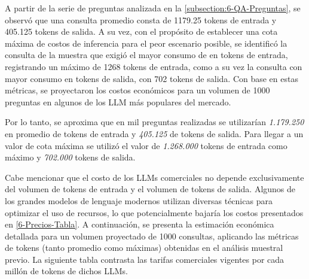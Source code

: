 A partir de la serie de preguntas analizada en la \autoref{subsection:6-QA-Preguntas}, se observó que una consulta promedio consta de 1179.25 tokens de entrada y 405.125 tokens de salida. A su vez, con el propósito de establecer una cota máxima de costos de inferencia para el peor escenario posible, se identificó la consulta de la muestra que exigió el mayor consumo de en tokens de entrada, registrando un máximo de 1268 tokens de entrada, como a su vez la consulta con mayor consumo en tokens de salida, con 702 tokens de salida. Con base en estas métricas, se proyectaron los costos económicos para un volumen de 1000 preguntas en algunos de los LLM más populares del mercado.

Por lo tanto, se aproxima que en mil preguntas realizadas se utilizarían \textit{1.179.250} en promedio de tokens de entrada y \textit{405.125} de tokens de salida. Para llegar a un valor de cota máxima se utilizó el valor de \textit{1.268.000} tokens de entrada como máximo y \textit{702.000} tokens de salida.  

Cabe mencionar que el costo de los LLMs comerciales no depende exclusivamente del volumen de tokens de entrada y el volumen de tokens de salida. Algunos de los grandes modelos de lenguaje modernos utilizan diversas técnicas para optimizar el uso de recursos, lo que potencialmente bajaría los costos presentados en \autoref{6-Precios-Tabla}.
A continuación, se presenta la estimación económica detallada para un volumen proyectado de 1000 consultas, aplicando las métricas de tokens (tanto promedio como máximas) obtenidas en el análisis muestral previo. La siguiente tabla contrasta las tarifas comerciales vigentes por cada millón de tokens de dichos LLMs.



